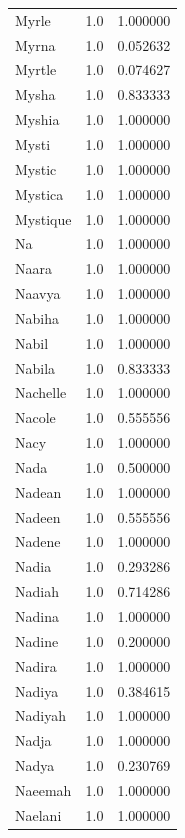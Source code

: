 \documentclass[
  letterpaper,
  DIV=11,
  numbers=noendperiod]{scrreprt}
\begin{document}
\begin{tabular}{lrr}
Myrle           &   1.0 &   1.000000 \\
Myrna           &   1.0 &   0.052632 \\
Myrtle          &   1.0 &   0.074627 \\
Mysha           &   1.0 &   0.833333 \\
Myshia          &   1.0 &   1.000000 \\
Mysti           &   1.0 &   1.000000 \\
Mystic          &   1.0 &   1.000000 \\
Mystica         &   1.0 &   1.000000 \\
Mystique        &   1.0 &   1.000000 \\
Na              &   1.0 &   1.000000 \\
Naara           &   1.0 &   1.000000 \\
Naavya          &   1.0 &   1.000000 \\
Nabiha          &   1.0 &   1.000000 \\
Nabil           &   1.0 &   1.000000 \\
Nabila          &   1.0 &   0.833333 \\
Nachelle        &   1.0 &   1.000000 \\
Nacole          &   1.0 &   0.555556 \\
Nacy            &   1.0 &   1.000000 \\
Nada            &   1.0 &   0.500000 \\
Nadean          &   1.0 &   1.000000 \\
Nadeen          &   1.0 &   0.555556 \\
Nadene          &   1.0 &   1.000000 \\
Nadia           &   1.0 &   0.293286 \\
Nadiah          &   1.0 &   0.714286 \\
Nadina          &   1.0 &   1.000000 \\
Nadine          &   1.0 &   0.200000 \\
Nadira          &   1.0 &   1.000000 \\
Nadiya          &   1.0 &   0.384615 \\
Nadiyah         &   1.0 &   1.000000 \\
Nadja           &   1.0 &   1.000000 \\
Nadya           &   1.0 &   0.230769 \\
Naeemah         &   1.0 &   1.000000 \\
Naelani         &   1.0 &   1.000000 \\

\end{tabular}
\end{document}
